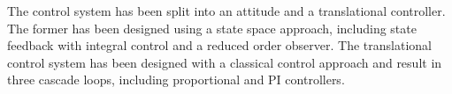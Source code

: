 The control system has been split into an attitude and a translational controller. The former has been designed using a state space approach, including state feedback with integral control and a reduced order observer. The translational control system has been designed with a classical control approach and result in three cascade loops, including proportional and PI controllers.